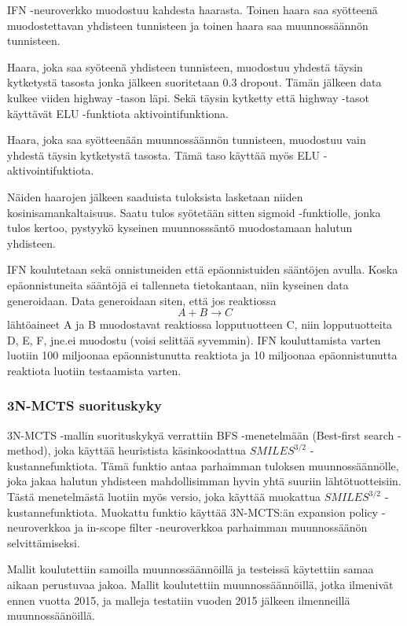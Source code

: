 \documentclass[finnish,twoside,censored,tkt,sw-line]{HYthesisML}
\begin{document}
IFN -neuroverkko muodostuu kahdesta haarasta.
Toinen haara saa syötteenä muodostettavan yhdisteen tunnisteen ja toinen haara saa muunnossäännön tunnisteen.

Haara, joka saa syöteenä yhdisteen tunnisteen, muodostuu yhdestä täysin kytketystä tasosta jonka jälkeen suoritetaan 0.3 dropout.
Tämän jälkeen data kulkee viiden highway -tason läpi.
Sekä täysin kytketty että highway -tasot käyttävät ELU -funktiota aktivointifunktiona.

Haara, joka saa syötteenään muunnossäännön tunnisteen, muodostuu vain yhdestä täysin kytketystä tasosta.
Tämä taso käyttää myös ELU -aktivointifuktiota.

Näiden haarojen jälkeen saaduista tuloksista lasketaan niiden kosinisamankaltaisuus.
Saatu tulos syötetään sitten sigmoid -funktiolle, jonka tulos kertoo, pystyykö kyseinen muunnosssäntö muodostamaan halutun yhdisteen.

IFN koulutetaan sekä onnistuneiden että epäonnistuiden sääntöjen avulla.
Koska epäonnistuneita sääntöjä ei tallenneta tietokantaan, niin kyseinen data generoidaan.
Data generoidaan siten, että jos reaktiossa \[A + B \rightarrow C\] lähtöaineet A ja B muodostavat reaktiossa lopputuotteen C, niin lopputuotteita D, E, F, jne.\@ ei muodostu (voisi selittää syvemmin).
IFN kouluttamista varten luotiin 100 miljoonaa epäonnistunutta reaktiota ja 10 miljoonaa epäonnistunutta reaktiota luotiin testaamista varten.

\subsubsection{3N-MCTS suorituskyky}

3N-MCTS -mallin suorituskykyä verrattiin BFS -menetelmään (Best-first search -method), joka käyttää heuristista käsinkoodattua \(SMILES^{3/2}\) -kustannefunktiota.
Tämä funktio antaa parhaimman tuloksen muunnossäännölle, joka jakaa halutun yhdisteen mahdollisimman hyvin yhtä suuriin lähtötuotteisiin.
Tästä menetelmästä luotiin myös versio, joka käyttää muokattua \(SMILES^{3/2}\) -kustannefunktiota.
Muokattu funktio käyttää 3N-MCTS:än expansion policy -neuroverkkoa ja in-scope filter -neuroverkkoa parhaimman muunnossäänön selvittämiseksi.

Mallit koulutettiin samoilla muunnossäännöillä ja testeissä käytettiin samaa aikaan perustuvaa jakoa.
Mallit koulutettiin muunnossäännöillä, jotka ilmenivät ennen vuotta 2015, ja malleja testatiin vuoden 2015 jälkeen ilmenneillä muunnossäänöillä.
\end{document}
